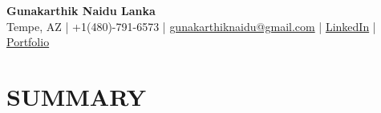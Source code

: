 \documentclass[letterpaper,10pt]{article}
\begin{document}
\pagestyle{empty}

\begin{center}
{\fontsize{16}{16}\selectfont\textbf{Gunakarthik Naidu Lanka}} \\[2pt]
{\fontsize{9.5}{9.5}\selectfont
Tempe, AZ \;|\; +1(480)-791-6573 \;|\;
\href{mailto:gunakarthiknaidu@gmail.com}{gunakarthiknaidu@gmail.com} \;|\;
\href{https://www.linkedin.com/in/gunakarthik-naidu-lanka}{LinkedIn} \;|\;
\href{https://gunakarthik-naidu-lanka-portfolio.vercel.app}{Portfolio}}
\end{center}

\vspace{1pt}

\section*{SUMMARY}
\end{document}
